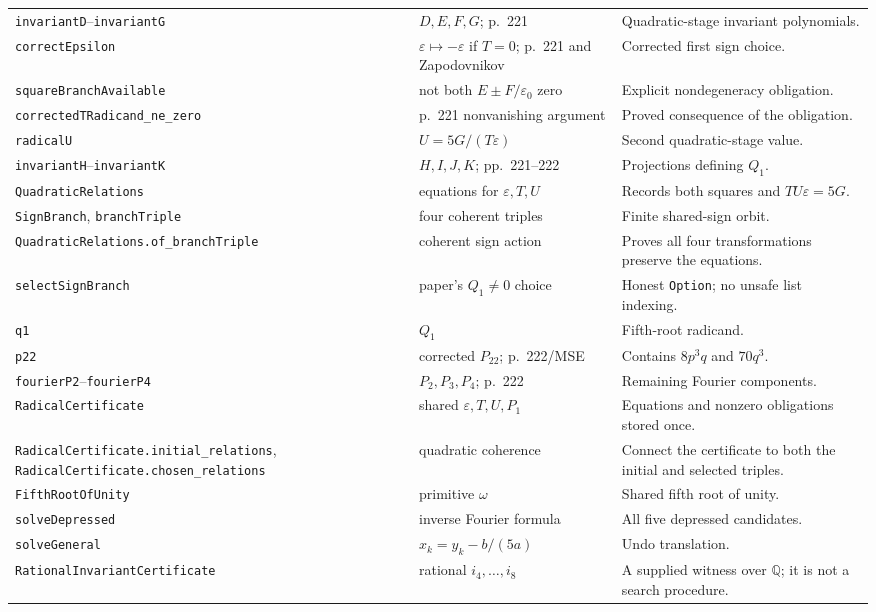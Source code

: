 \documentclass[11pt,a4paper,oneside]{article}
\newcommand{\lean}[1]{\nolinkurl{#1}}
\newcommand{\Q}{\mathbb{Q}}
\newcommand{\eps}{\varepsilon}
\newcommand{\ii}[1]{i_{#1}}
\begin{document}
\begin{longtable}{>{\raggedright\arraybackslash}p{}
                  >{\raggedright\arraybackslash}p{}
                  >{\raggedright\arraybackslash}p{}}
\lean{invariantD}--\lean{invariantG} & $D,E,F,G$; p.~221 & Quadratic-stage invariant polynomials.\\
\lean{correctEpsilon} & $\eps\mapsto-\eps$ if $T=0$; p.~221 and Zapodovnikov & Corrected first sign choice.\\
\lean{squareBranchAvailable} & not both $E\pm F/\eps_0$ zero & Explicit nondegeneracy obligation.\\
\lean{correctedTRadicand_ne_zero} & p.~221 nonvanishing argument & Proved consequence of the obligation.\\
\lean{radicalU} & $U=5G/(T\eps)$ & Second quadratic-stage value.\\
\lean{invariantH}--\lean{invariantK} & $H,I,J,K$; pp.~221--222 & Projections defining $Q_1$.\\
\lean{QuadraticRelations} & equations for $\eps,T,U$ & Records both squares and $TU\eps=5G$.\\
\lean{SignBranch}, \lean{branchTriple} & four coherent triples & Finite shared-sign orbit.\\
\lean{QuadraticRelations.of_branchTriple} & coherent sign action & Proves all four transformations preserve the equations.\\
\lean{selectSignBranch} & paper's $Q_1\ne0$ choice & Honest \lean{Option}; no unsafe list indexing.\\
\lean{q1} & $Q_1$ & Fifth-root radicand.\\
\lean{p22} & corrected $P_{22}$; p.~222/MSE & Contains $8p^3q$ and $70q^3$.\\
\lean{fourierP2}--\lean{fourierP4} & $P_2,P_3,P_4$; p.~222 & Remaining Fourier components.\\
\lean{RadicalCertificate} & shared $\eps,T,U,P_1$ & Equations and nonzero obligations stored once.\\
\lean{RadicalCertificate.initial_relations}, \lean{RadicalCertificate.chosen_relations} & quadratic coherence & Connect the certificate to both the initial and selected triples.\\
\lean{FifthRootOfUnity} & primitive $\omega$ & Shared fifth root of unity.\\
\lean{solveDepressed} & inverse Fourier formula & All five depressed candidates.\\
\lean{solveGeneral} & $x_k=y_k-b/(5a)$ & Undo translation.\\
\lean{RationalInvariantCertificate} & rational $\ii4,\ldots,\ii8$ & A supplied witness over $\Q$; it is not a search procedure.\\

\end{longtable}
\end{document}
